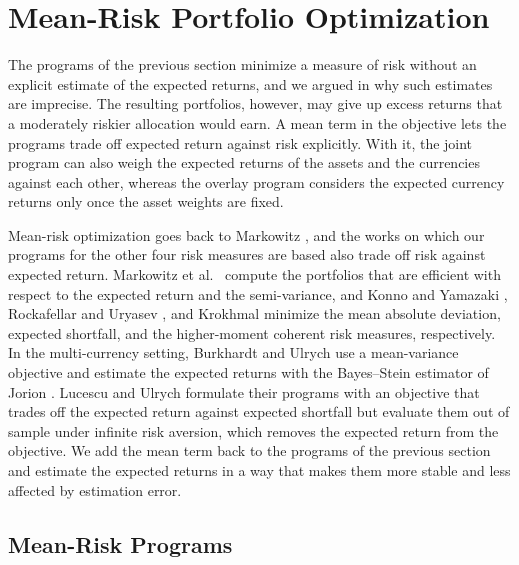 \section{Mean-Risk Portfolio Optimization} \label{sec:mean-risk-portfolio-optimization}
 
The programs of the previous section minimize a measure of risk without an explicit estimate of the expected returns,
and we argued in  why such estimates are imprecise. The resulting portfolios,
however, may give up excess returns that a moderately riskier allocation would earn. A mean term in the objective lets
the programs trade off expected return against risk explicitly. With it, the joint program can also weigh the expected
returns of the assets and the currencies against each other, whereas the overlay program considers the expected
currency returns only once the asset weights are fixed.

Mean-risk optimization goes back to Markowitz \cite{Markowitz1952}, and the works on which our programs for the other
four risk measures are based also trade off risk against expected return. Markowitz et al.~\cite{Markowitz1993} compute
the portfolios that are efficient with respect to the expected return and the semi-variance, and Konno and Yamazaki
\cite{KonnoYamazaki1991}, Rockafellar and Uryasev \cite{RockafellarUryasev2000}, and Krokhmal \cite{Krokhmal2007}
minimize the mean absolute deviation, expected shortfall, and the higher-moment coherent risk measures, respectively. 
In the multi-currency setting, Burkhardt and Ulrych
\cite{SparseAndStableInternationalPortfolioOptimization} use a mean-variance objective and estimate the expected returns with 
the Bayes--Stein estimator of Jorion \cite{Jorion1986BayesStein}.
Lucescu and Ulrych \cite{RegularizedMultiCurrencyExpectedShortfallPortfolios} formulate their programs with an objective
that trades off the expected return against expected shortfall but evaluate them out of sample under infinite risk
aversion, which removes the expected return from the objective. We add the mean term back to the programs
of the previous section and estimate the expected returns in a way that makes them more stable and less affected by estimation error.

\subsection{Mean-Risk Programs}\label{sec:mean-risk-programs}


